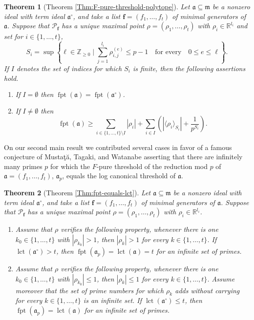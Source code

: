 \documentclass[12pt]{amsart}
\newtheorem{theoremx}{Theorem}
\theoremstyle{definition}
\numberwithin{equation}{subsection}
\DeclareMathOperator{\fpt}{fpt}
\newcommand{\lct}{{\operatorname{lct}}}
\newcommand{\RR}{\mathbb{R}}
\newcommand{\m}{\mathfrak{m}}
\newcommand{\fa}{\mathfrak{a}}
\newcommand{\SP}{\mathcal{P}}
\newcommand{\Bf}{\boldsymbol{f}}
\renewcommand{\!}[1]{{\color{red}\text{\Huge$\star$ }#1}}
\begin{document}
\begin{theoremx}[{Theorem \ref{Thm:F-pure-threshold-polytope}}]\label{Thm: first main theorem}
		Let $\fa \subseteq \m$ be a nonzero ideal with term ideal $\fa^\circ$, and take a list $\Bf=(f_1,\ldots,f_t)$  of minimal generators of $\fa$. Suppose that $\SP_{\Bf}$ has a unique maximal point $\rho=(\rho_1, \ldots, \rho_t)$ with $\rho_i \in \RR^{l_i}$ and set for $i\in\{1,\ldots,t\}$,
		$$S_i=\sup \left\{\ell\in\mathbb{Z}_{\geq 0} \mid \sum_{j=1}^{l_i} \rho_{i,j}^{(e)}  \leq p-1\quad\text{for every}\quad 0 \leq e \leq \ell  \right\}.$$ 
		If $I$ denotes the set of indices for which $S_i$ is finite, then the following assertions hold.
		\begin{enumerate}
			\item If $I= \emptyset$ then $\fpt(\fa)=\fpt(\fa^\circ)$. 
			\item If $I \ne \emptyset$ then 
			$$\fpt(\fa) \geq \sum_{i \in \{1,\ldots,t\} \setminus I}|\rho_i| + \sum_{i \in I}\left(|\langle \rho_i \rangle_{S_i}|+\frac{1}{p^{S_i}}\right).$$
		\end{enumerate}
\end{theoremx} 

On our second main result we contributed several cases in favor of a famous conjecture of Musta\c{t}\u{a}, Tagaki, and Watanabe \cite[Conjecture 3.6]{MTW} asserting  that there are infinitely many primes $p$ for which the $F$-pure threshold of the reduction mod $p$ of $\fa=(f_1,\ldots,f_t)$, $\fa_p$, equals the log canonical threshold of $\fa$. 
\begin{theoremx}[{Theorem \ref{Thm:fpt-equals-lct}}]
	Let $\fa \subseteq \m$ be a nonzero ideal with term ideal $\fa^\circ$, and take a list $\Bf=(f_1,\ldots,f_t)$  of minimal generators of $\fa$. Suppose that $\SP_{\Bf}$ has a unique maximal point $\rho=(\rho_1, \ldots, \rho_t)$ with $\rho_i \in \RR^{l_i}$. 
	\begin{enumerate}
		\item Assume that $\rho$ verifies the following property, whenever there is one $k_0\in\{1,\ldots,t\}$ with $|\rho_{k_0}|>1$, then $|\rho_k|>1$ for every $k\in\{1,\ldots,t\}$. If $\lct(\fa^\circ)>t$, then $\fpt(\fa_p)=\lct(\fa)=t$ for an infinite set of primes. 
		\item Assume that $\rho$ verifies the following property, whenever there is one $k_0\in\{1,\ldots,t\}$ with $|\rho_{k_0}|\leq 1$, then $|\rho_k|\leq 1$ for every $k\in\{1,\ldots,t\}$. Assume moreover that the set of prime numbers for which $\rho_k$ adds without carrying for every $k\in\{1,\ldots,t\}$ is an infinite set. If $\lct(\fa^\circ)\leq t$, then $\fpt(\fa_p)=\lct(\fa)$ for an infinite set of primes.
	\end{enumerate}
\end{theoremx}
\end{document}
